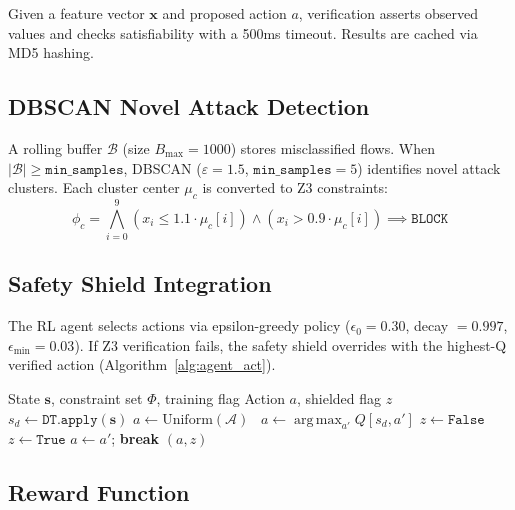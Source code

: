 \documentclass[conference]{IEEEtran}
\DeclareMathOperator*{\argmax}{arg\,max}
\newcommand{\bx}{\mathbf{x}}
\newcommand{\bs}{\mathbf{s}}
\begin{document}
Given a feature vector $\bx$ and proposed action $a$, verification asserts observed values and checks satisfiability with a 500ms timeout. Results are cached via MD5 hashing.

\subsection{DBSCAN Novel Attack Detection}

A rolling buffer $\mathcal{B}$ (size $B_{\max} = 1000$) stores misclassified flows. When $|\mathcal{B}| \geq \texttt{min\_samples}$, DBSCAN ($\varepsilon = 1.5$, $\texttt{min\_samples} = 5$) identifies novel attack clusters. Each cluster center $\mu_c$ is converted to Z3 constraints:
\begin{equation}
\phi_c = \bigwedge_{i=0}^{9} (x_i \leq 1.1 \cdot \mu_c[i]) \wedge (x_i > 0.9 \cdot \mu_c[i]) \implies \texttt{BLOCK}
\end{equation}

\subsection{Safety Shield Integration}

The RL agent selects actions via epsilon-greedy policy ($\epsilon_0 = 0.30$, decay $= 0.997$, $\epsilon_{\min} = 0.03$). If Z3 verification fails, the safety shield overrides with the highest-Q verified action (Algorithm~\ref{alg:agent_act}).

\begin{algorithm}[htbp]
\caption{SymbolicShieldAgent Action Selection}
\label{alg:agent_act}
\footnotesize
\begin{algorithmic}[1]
\Require State $\bs$, constraint set $\Phi$, training flag
\Ensure Action $a$, shielded flag $z$
\State $s_d \leftarrow \texttt{DT.apply}(\bs)$
    $a \leftarrow \text{Uniform}(\mathcal{A})$
\Else~$a \leftarrow \argmax_{a'} Q[s_d, a']$
\EndIf
\State $z \leftarrow \texttt{False}$
\If{$\neg \texttt{verify}(\Phi, \bs, a)$}
    \State $z \leftarrow \texttt{True}$
        \If{$\texttt{verify}(\Phi, \bs, a')$} $a \leftarrow a'$; \textbf{break} \EndIf
    \EndFor
\EndIf
\State \Return $(a, z)$
\end{algorithmic}
\end{algorithm}

\subsection{Reward Function}
\end{document}
